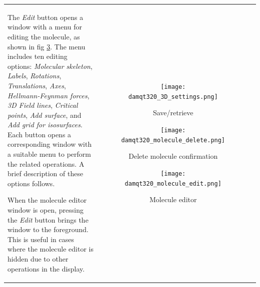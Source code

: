 \documentclass[10pt]{article}
\begin{document}
\begin{tabular}{lcr}
\begin{minipage}{.5\linewidth}
The {\it Edit} button\index{3D graphics!edit molecule} opens a window with a menu for editing the molecule,  
as shown in fig \ref{fig:4_13_2}. The menu includes ten editing options:  
{\it Molecular skeleton}, {\it Labels}, {\it Rotations},  
{\it Translations}, {\it Axes}, {\it Hellmann-Feynman forces},  
{\it 3D Field lines}, {\it Critical points}, {\it Add surface}, and  
{\it Add grid for isosurfaces}. Each button opens a corresponding window  
with a suitable menu to perform the related operations. A brief description  
of these options follows.  

When the molecule editor window is open, pressing the {\it Edit} button\index{3D graphics!show molecule editor}  
brings the window to the foreground. This is useful in cases where the molecule editor  
is hidden due to other operations in the display.



\end{minipage}
&
\begin{minipage}{.5\linewidth}

\begin{figure}[H]
    \begin{center}
        \texttt{[image: damqt320\_3D\_settings.png]}
    \end{center}
    \vspace*{5mm}
    \caption{Save/retrieve \label{fig:4_12}}
\end{figure}

\begin{figure}[H]
    \begin{center}
        \texttt{[image: damqt320\_molecule\_delete.png]}
    \end{center}
    \caption{Delete molecule confirmation \label{fig:4_13_1}}
\end{figure}

\begin{figure}[H]
    \begin{center}
        \texttt{[image: damqt320\_molecule\_edit.png]}
    \end{center}
    \caption{{Molecule editor}\label{fig:4_13_2}}
\end{figure}
\end{minipage}
\end{tabular}
\end{document}
